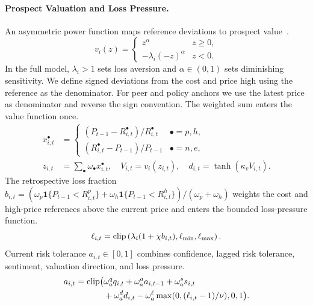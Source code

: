 \paragraph{Prospect Valuation and Loss Pressure.} An asymmetric power function maps reference deviations to prospect value~\cite{tversky1992advances}.
\begin{equation}
v_i(z)=\begin{cases}z^\alpha&z\ge0,\\-\lambda_i(-z)^\alpha&z<0.\end{cases}
  \label{eq:prospect_v}
\end{equation}
In the full model, $\lambda_i>1$ sets loss aversion and $\alpha\in(0,1)$ sets diminishing sensitivity. We define signed deviations from the cost and price high using the reference as the denominator. For peer and policy anchors we use the latest price as denominator and reverse the sign convention. The weighted sum enters the value function once.
\begin{equation}
\begin{split}x^\bullet_{i,t}&=\begin{cases}(P_{t-1}-R^\bullet_{i,t})/R^\bullet_{i,t}&\bullet=p,h,\\(R^\bullet_{i,t}-P_{t-1})/P_{t-1}&\bullet=n,e,\end{cases}\\z_{i,t}&=\sum_\bullet\omega_\bullet x^\bullet_{i,t},\quad V_{i,t}=v_i(z_{i,t}),\quad d_{i,t}=\tanh(\kappa_vV_{i,t}).\end{split}
  \label{eq:aggregate_v}
\end{equation}
The retrospective loss fraction $b_{i,t}=(\omega_p\mathbf{1}\{P_{t-1}<R^p_{i,t}\}+\omega_h\mathbf{1}\{P_{t-1}<R^h_{i,t}\})/(\omega_p+\omega_h)$ weights the cost and high-price references above the current price and enters the bounded loss-pressure function.
\begin{equation}
  \ell_{i,t} = \operatorname{clip}\left( \lambda_i (1 + \chi b_{i,t}), \ell_{\min}, \ell_{\max} \right).
  \label{eq:loss_pressure}
\end{equation}
Current risk tolerance $a_{i,t}\in[0,1]$ combines confidence, lagged risk tolerance, sentiment, valuation direction, and loss pressure.
\begin{equation}
\begin{split}a_{i,t}=\operatorname{clip}\bigl(&\omega_a^q q_{i,t}+\omega_a^a a_{i,t-1}+\omega_a^s s_{i,t}\\&+\omega_a^d d_{i,t}-\omega_a^\ell\max(0,(\ell_{i,t}-1)/\nu),0,1\bigr).\end{split}
  \label{eq:risk_tolerance}
\end{equation}


